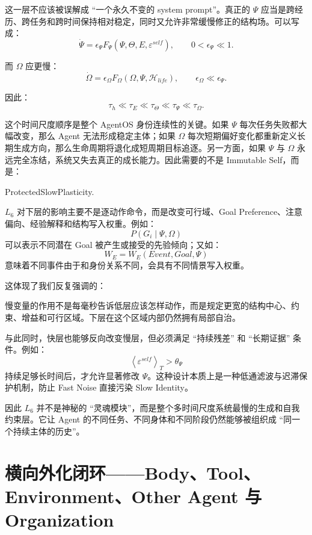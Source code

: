 这一层不应该被误解成 ``一个永久不变的 system prompt''。真正的 $\Psi$ 应当是跨经历、跨任务和跨时间保持相对稳定，同时又允许非常缓慢修正的结构场。可以写成：
\[
\dot{\Psi}
=
\epsilon_\Psi
F_\Psi
\left(
\Psi,
\Theta,
E,
\varepsilon^{self}
\right),
\qquad
0<\epsilon_\Psi\ll 1.
\]

而 $\Omega$ 应更慢：
\[
\dot{\Omega}
=
\epsilon_\Omega
F_\Omega
\left(
\Omega,
\Psi,
\mathcal H_{life}
\right),
\qquad
\epsilon_\Omega
\ll
\epsilon_\Psi.
\]

因此：
\[
\boxed{
\tau_h
\ll
\tau_E
\ll
\tau_\Theta
\ll
\tau_\Psi
\ll
\tau_\Omega.
}
\]

这个时间尺度顺序是整个 AgentOS 身份连续性的关键。如果 $\Psi$ 每次任务失败都大幅改变，那么 Agent 无法形成稳定主体；如果 $\Omega$ 每次短期偏好变化都重新定义长期生成方向，那么生命周期将退化成短周期目标追逐。另一方面，如果 $\Psi$ 与 $\Omega$ 永远完全冻结，系统又失去真正的成长能力。因此需要的不是 Immutable Self，而是：
\begin{statementbox}
ProtectedSlowPlasticity.
\end{statementbox}

$L_6$ 对下层的影响主要不是逐动作命令，而是改变可行域、Goal Preference、注意偏向、经验解释和结构写入权重。例如：
\[
P(G_i\mid\Psi,\Omega)
\]
可以表示不同潜在 Goal 被产生或接受的先验倾向；又如：
\[
W_E
=
W_E
\left(
Event,
Goal,
\Psi
\right)
\]
意味着不同事件由于和身份关系不同，会具有不同情景写入权重。

这体现了我们反复强调的：
\begin{statementbox}
\centering
{}
\end{statementbox}
慢变量的作用不是每毫秒告诉低层应该怎样动作，而是规定更宽的结构中心、约束、增益和可行区域。下层在这个区域内部仍然拥有局部自治。

与此同时，快层也能够反向改变慢层，但必须满足 ``持续残差'' 和 ``长期证据'' 条件。例如：
\[
\left\langle
\varepsilon^{self}
\right\rangle_T
>
\theta_\Psi
\]
持续足够长时间后，才允许显著修改 $\Psi$。这种设计本质上是一种低通滤波与迟滞保护机制，防止 Fast Noise 直接污染 Slow Identity。

因此 $L_6$ 并不是神秘的 ``灵魂模块''，而是整个多时间尺度系统最慢的生成和自我约束层。它让 Agent 的不同任务、不同身体和不同阶段仍然能够被组织成 ``同一个持续主体的历史''。

\section{横向外化闭环——Body、Tool、Environment、Other Agent 与 Organization}

